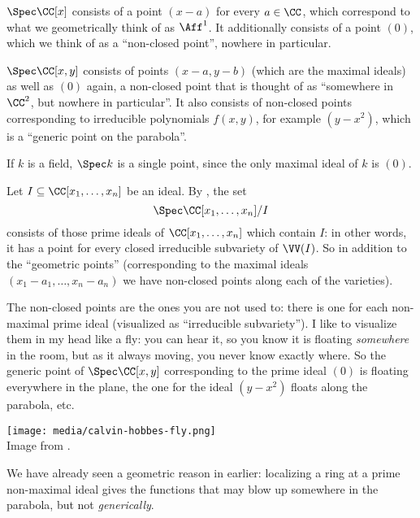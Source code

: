 \begin{example}
	\listhack
	\begin{enumerate}[(a)]
		\ii $\Spec \CC[x]$ consists of a point $(x-a)$ for every $a \in \CC$,
		which correspond to what we geometrically think of as $\Aff^1$.
		It additionally consists of a point $(0)$,
		which we think of as a ``non-closed point'', nowhere in particular.

		\ii $\Spec \CC[x,y]$ consists of points $(x-a,y-b)$
		(which are the maximal ideals) as well as $(0)$ again,
		a non-closed point that is thought of as ``somewhere in $\CC^2$,
		but nowhere in particular''.
		It also consists of non-closed points corresponding to irreducible
		polynomials $f(x,y)$, for example $(y-x^2)$,
		which is a ``generic point on the parabola''.

		\ii If $k$ is a field, $\Spec k$ is a single point,
		since the only maximal ideal of $k$ is $(0)$.
	\end{enumerate}
\end{example}

\begin{example}
	Let $I \subseteq \CC[x_1, \dots, x_n]$ be an ideal.
	By ,
	the set \[ \Spec \CC[x_1, \dots, x_n] /I \]
	consists of those prime ideals of $\CC[x_1, \dots, x_n]$
	which contain $I$: in other words, it has a
	point for every closed irreducible subvariety of $\VV(I)$.
	So in addition to the ``geometric points''
	(corresponding to the maximal ideals $(x_1-a_1, \dots, x_n-a_n)$
	we have non-closed points along each of the varieties).
\end{example}

The non-closed points are the ones you are not used to:
there is one for each non-maximal prime ideal
(visualized as ``irreducible subvariety'').
I like to visualize them in my head like a fly:
you can hear it, so you know it is floating \emph{somewhere} in the room,
but as it always moving, you never know exactly where.
So the generic point of $\Spec \CC[x,y]$ corresponding to the prime
ideal $(0)$ is floating everywhere in the plane,
the one for the ideal $(y-x^2)$ floats along the parabola, etc.
\begin{center}
	\texttt{[image: media/calvin-hobbes-fly.png]} \\
	\footnotesize Image from \cite{img:calvin_hobbes_fly}.
\end{center}

\begin{remark}
	We have already seen a geometric reason in  earlier:
	localizing a ring at a prime non-maximal ideal gives the functions that may blow up somewhere in the
	parabola, but not \emph{generically}.
\end{remark}

